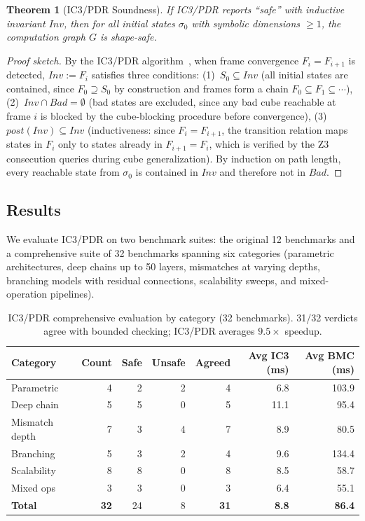 \documentclass[11pt]{article}
\newtheorem{theorem}{Theorem}
\begin{document}
\begin{theorem}[IC3/PDR Soundness]
If IC3/PDR reports ``safe'' with inductive invariant $\mathit{Inv}$,
then for all initial states $\sigma_0$ with symbolic dimensions
$\geq 1$, the computation graph $G$ is shape-safe.
\end{theorem}

\begin{proof}[Proof sketch]
By the IC3/PDR algorithm~\cite{bradley11}, when frame convergence
$F_i = F_{i+1}$ is detected, $\mathit{Inv} := F_i$ satisfies three conditions:
(1)~$S_0 \subseteq \mathit{Inv}$ (all initial states are contained, since
$F_0 \supseteq S_0$ by construction and frames form a chain
$F_0 \subseteq F_1 \subseteq \cdots$),
(2)~$\mathit{Inv} \cap \mathit{Bad} = \emptyset$ (bad states are excluded,
since any bad cube reachable at frame $i$ is blocked by the
cube-blocking procedure before convergence),
(3)~$\mathit{post}(\mathit{Inv}) \subseteq \mathit{Inv}$ (inductiveness:
since $F_i = F_{i+1}$, the transition relation maps states in $F_i$
only to states already in $F_{i+1} = F_i$, which is verified by the
Z3 consecution queries during cube generalization).
By induction on path length, every reachable state from $\sigma_0$
is contained in $\mathit{Inv}$ and therefore not in $\mathit{Bad}$.
\end{proof}

\subsection{Results}

We evaluate IC3/PDR on two benchmark suites: the original 12
benchmarks and a comprehensive suite of 32 benchmarks spanning
six categories (parametric architectures, deep chains up to 50 layers,
mismatches at varying depths, branching models with residual
connections, scalability sweeps, and mixed-operation pipelines).

\begin{table}[t]
\centering
\caption{IC3/PDR comprehensive evaluation by category (32 benchmarks).
  31/32 verdicts agree with bounded checking; IC3/PDR averages
  $9.5\times$ speedup.}
\label{tab:ic3}
\small
\begin{tabular}{@{}lrrrrrr@{}}
\toprule
\textbf{Category} & \textbf{Count} & \textbf{Safe} & \textbf{Unsafe} &
  \textbf{Agreed} & \textbf{Avg IC3 (ms)} & \textbf{Avg BMC (ms)} \\
\midrule
Parametric         & 4  & 2 & 2 & 4 &  6.8 & 103.9 \\
Deep chain         & 5  & 5 & 0 & 5 & 11.1 &  95.4 \\
Mismatch depth     & 7  & 3 & 4 & 7 &  8.9 &  80.5 \\
Branching          & 5  & 3 & 2 & 4 &  9.6 & 134.4 \\
Scalability        & 8  & 8 & 0 & 8 &  8.5 &  58.7 \\
Mixed ops          & 3  & 3 & 0 & 3 &  6.4 &  55.1 \\
\midrule
\textbf{Total}     & \textbf{32} & 24 & 8 & \textbf{31} &
  \textbf{8.8} & \textbf{86.4} \\
\bottomrule
\end{tabular}
\end{table}
\end{document}
